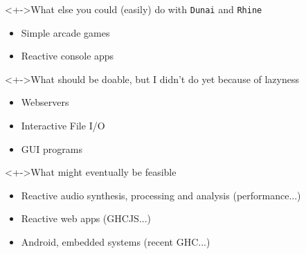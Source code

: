 \documentclass[handout]{enigtex-beamer-base}
\begin{document}
\begin{frame}
	\begin{block}<+->{What else you could (easily) do with \texttt{Dunai} and \texttt{Rhine}}
		\begin{itemize}
			\item Simple arcade games
			\item Reactive console apps
		\end{itemize}
	\end{block}
	\begin{block}<+->{What should be doable, but I didn't do yet because of lazyness}
		\begin{itemize}
			\item Webservers
			\item Interactive File I/O
			\item GUI programs
		\end{itemize}
	\end{block}
	\begin{block}<+->{What might eventually be feasible}
		\begin{itemize}
			\item Reactive audio synthesis, processing and analysis (performance...)
			\item Reactive web apps (GHCJS...)
			\item Android, embedded systems (recent GHC...)
		\end{itemize}
	\end{block}
\end{frame}
\end{document}
